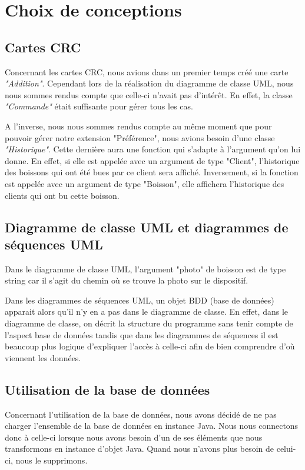 \documentclass[11pt, a4, oneside, headings=normal]{scrreprt}
\begin{document}
\section*{Choix de conceptions}

\subsection*{Cartes CRC}

Concernant les cartes CRC, nous avions dans un premier temps créé une carte \textit{"Addition"}. Cependant lors de la réalisation du diagramme de classe UML, nous nous sommes rendus compte que celle-ci n'avait pas d'intérêt. En effet, la classe \textit{"Commande"} était suffisante pour gérer tous les cas.

A l'inverse, nous nous sommes rendus compte au même moment que pour pouvoir gérer notre extension "Préférence", nous avions besoin d'une classe \textit{"Historique"}. Cette dernière aura une fonction qui s'adapte à l'argument qu'on lui donne. En effet, si elle est appelée avec un argument de type "Client", l'historique des boissons qui ont été bues par ce client sera affiché. Inversement, si la fonction est appelée avec un argument de type "Boisson", elle affichera l'historique des clients qui ont bu cette boisson.

\subsection*{Diagramme de classe UML et diagrammes de séquences UML}

Dans le diagramme de classe UML, l'argument "photo" de boisson est de type string car il s'agit du chemin où se trouve la photo sur le dispositif.

Dans les diagrammes de séquences UML, un objet BDD (base de données) apparait alors qu'il n'y en a pas dans le diagramme de classe.
En effet, dans le diagramme de classe, on décrit la structure du programme sans tenir compte de l'aspect base de données tandis que dans les diagrammes de séquences il est beaucoup plus logique d'expliquer l'accès à celle-ci afin de bien comprendre d'où viennent les données.

\subsection*{Utilisation de la base de données}

Concernant l'utilisation de la base de données, nous avons décidé de ne pas charger l'ensemble de la base de données en instance Java. Nous nous connectons donc à celle-ci lorsque nous avons besoin d'un de ses éléments que nous transformons en instance d'objet Java. Quand nous n'avons plus besoin de celui-ci, nous le supprimons.
\end{document}
